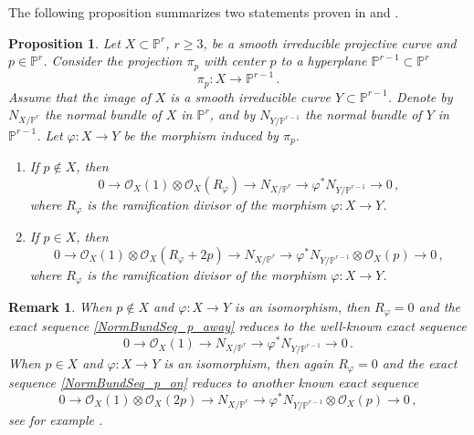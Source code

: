 \documentclass[a4paper,12pt]{amsart}
\newtheorem{remark}[thm]{Remark}
\newtheorem{prop}[thm]{Proposition}
\begin{document}
The following proposition summarizes two statements proven in \cite[Lemma~4]{CIK21} and \cite[Proposition~3]{CIK24a}.
\begin{prop}\label{Prop_NormBundSeq}
Let $X \subset \mathbb{P}^r$, $r \geq 3$, be a smooth irreducible projective curve and $p \in \mathbb{P}^r$. Consider the projection $\pi_p$ with center $p$ to a hyperplane $\mathbb{P}^{r-1} \subset \mathbb{P}^r$
\[
 \pi_p : X \to \mathbb{P}^{r-1} \, .
\]
Assume that the image of $X$ is a smooth irreducible curve $Y \subset \mathbb{P}^{r-1}$. Denote by $N_{X / \mathbb{P}^r}$ the normal bundle of $X$ in $\mathbb{P}^r$, and by $N_{Y / \mathbb{P}^{r-1}}$ the normal bundle of $Y$ in $\mathbb{P}^{r-1}$. Let $\varphi : X \to Y$ be the morphism induced by $\pi_p$.
\begin{enumerate}[label=(\alph*), leftmargin=*, font=\rmfamily]
 \item If $p \notin X$, then
\begin{equation}\label{NormBundSeq_p_away}
 0 \to \mathcal{O}_X (1) \otimes \mathcal{O}_X (R_{\varphi}) \to N_{X / \mathbb{P}^r} \to \varphi^{\ast} N_{Y / \mathbb{P}^{r-1}} \to 0 \, ,
\end{equation}
where $R_{\varphi}$ is the ramification divisor of the morphism $\varphi : X \to Y$.

 \item If $p \in X$, then
\begin{equation}\label{NormBundSeq_p_on}
 0 \to \mathcal{O}_X (1) \otimes \mathcal{O}_X (R_{\varphi} + 2p) \to N_{X / \mathbb{P}^r} \to \varphi^{\ast} N_{Y / \mathbb{P}^{r-1}}  \otimes \mathcal{O}_X (p) \to 0 \, ,
\end{equation}
where $R_{\varphi}$ is the ramification divisor of the morphism $\varphi : X \to Y$.
\end{enumerate}
\end{prop}
\begin{remark}
When $p \notin X$ and $\varphi : X \to Y$ is an isomorphism, then $R_{\varphi} = 0$ and the exact sequence \eqref{NormBundSeq_p_away} reduces to the well-known exact sequence
\begin{equation*}\label{NormBundSeq_p_away_iso}
 0 \to \mathcal{O}_X (1) \to N_{X / \mathbb{P}^r} \to \varphi^{\ast} N_{Y / \mathbb{P}^{r-1}} \to 0 \, .
\end{equation*}
When $p \in X$ and $\varphi : X \to Y$ is an isomorphism, then again $R_{\varphi} = 0$ and the exact sequence \eqref{NormBundSeq_p_on} reduces to another known exact sequence
\begin{equation*}\label{NormBundSeq_p_on_iso}
 0 \to \mathcal{O}_X (1) \otimes \mathcal{O}_X (2p) \to N_{X / \mathbb{P}^r} \to \varphi^{\ast} N_{Y / \mathbb{P}^{r-1}}  \otimes \mathcal{O}_X (p) \to 0 \, ,
\end{equation*}
see for example \cite[Proposition~6]{FS19}.
\end{remark}
\end{document}
